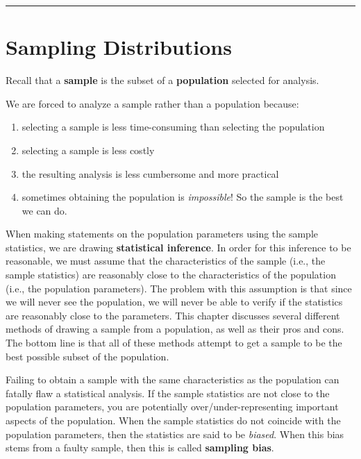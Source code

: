 \documentclass[
]{book}
\begin{document}
\begin{center}\rule{0.5\linewidth}{0.5pt}\end{center}

\hypertarget{sampling-distributions}{%
\section{Sampling Distributions}\label{sampling-distributions}}

Recall that a \textbf{sample} is the subset of a \textbf{population} selected for analysis.

We are forced to analyze a sample rather than a population because:

\begin{enumerate}
\def\labelenumi{\arabic{enumi}.}
\item
  selecting a sample is less time-consuming than selecting the population
\item
  selecting a sample is less costly
\item
  the resulting analysis is less cumbersome and more practical
\item
  sometimes obtaining the population is \emph{impossible}! So the sample is the best we can do.
\end{enumerate}

When making statements on the population parameters using the sample statistics, we are drawing \textbf{statistical inference}. In order for this inference to be reasonable, we must assume that the characteristics of the sample (i.e., the sample statistics) are reasonably close to the characteristics of the population (i.e., the population parameters). The problem with this assumption is that since we will never see the population, we will never be able to verify if the statistics are reasonably close to the parameters. This chapter discusses several different methods of drawing a sample from a population, as well as their pros and cons. The bottom line is that all of these methods attempt to get a sample to be the best possible subset of the population.

Failing to obtain a sample with the same characteristics as the population can fatally flaw a statistical analysis. If the sample statistics are not close to the population parameters, you are potentially over/under-representing important aspects of the population. When the sample statistics do not coincide with the population parameters, then the statistics are said to be \emph{biased}. When this bias stems from a faulty sample, then this is called \textbf{sampling bias}.
\end{document}
